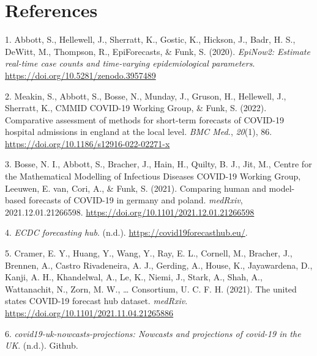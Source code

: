 \documentclass[
]{article}
\newlength{\cslhangindent}
\newlength{\cslentryspacingunit} %
\newenvironment{CSLReferences}[2] %
 {%
  \setlength{\parindent}{0pt}
  \ifodd #1
  \let\oldpar\par
  \def\par{\hangindent=\cslhangindent\oldpar}
  \fi
  \setlength{\parskip}{#2\cslentryspacingunit}
 }%
 {}
\begin{document}
\hypertarget{references}{%
\section*{References}\label{references}}

\hypertarget{refs}{}
\begin{CSLReferences}{1}{0}
\leavevmode{}%
1. Abbott, S., Hellewell, J., Sherratt, K., Gostic, K., Hickson, J.,
Badr, H. S., DeWitt, M., Thompson, R., EpiForecasts, \& Funk, S. (2020).
\emph{EpiNow2: Estimate real-time case counts and time-varying
epidemiological parameters}.
\url{https://doi.org/10.5281/zenodo.3957489}

\leavevmode{}%
2. Meakin, S., Abbott, S., Bosse, N., Munday, J., Gruson, H., Hellewell,
J., Sherratt, K., CMMID COVID-19 Working Group, \& Funk, S. (2022).
Comparative assessment of methods for short-term forecasts of {COVID-19}
hospital admissions in england at the local level. \emph{BMC Med.},
\emph{20}(1), 86. \url{https://doi.org/10.1186/s12916-022-02271-x}

\leavevmode{}%
3. Bosse, N. I., Abbott, S., Bracher, J., Hain, H., Quilty, B. J., Jit,
M., Centre for the Mathematical Modelling of Infectious Diseases
COVID-19 Working Group, Leeuwen, E. van, Cori, A., \& Funk, S. (2021).
Comparing human and model-based forecasts of {COVID-19} in germany and
poland. \emph{medRxiv}, 2021.12.01.21266598.
\url{https://doi.org/10.1101/2021.12.01.21266598}

\leavevmode{}%
4. \emph{{ECDC} forecasting hub}. (n.d.).
\url{https://covid19forecasthub.eu/}.

\leavevmode{}%
5. Cramer, E. Y., Huang, Y., Wang, Y., Ray, E. L., Cornell, M., Bracher,
J., Brennen, A., Castro Rivadeneira, A. J., Gerding, A., House, K.,
Jayawardena, D., Kanji, A. H., Khandelwal, A., Le, K., Niemi, J., Stark,
A., Shah, A., Wattanachit, N., Zorn, M. W., \ldots{} Consortium, U. C.
F. H. (2021). The united states COVID-19 forecast hub dataset.
\emph{medRxiv}. \url{https://doi.org/10.1101/2021.11.04.21265886}

\leavevmode{}%
6. \emph{covid19-uk-nowcasts-projections: Nowcasts and projections of
covid-19 in the {UK}}. (n.d.). Github.


\end{CSLReferences}
\end{document}
